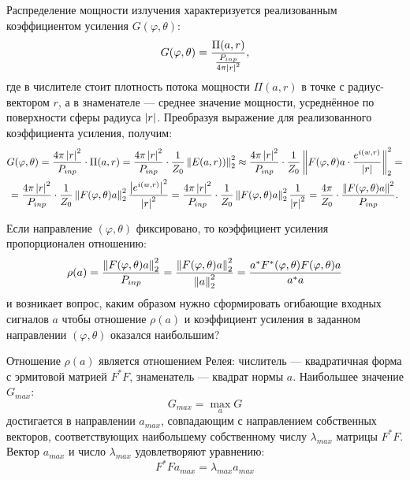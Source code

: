 Распределение мощности излучения характеризуется реализованным коэффициентом усиления $G(\varphi, \theta)$:
\[
    G(\varphi, \theta)
    = \frac{\Pi(a, r)}{\frac{P_{inp}}{4 \pi \left | r \right |^2}},
\]
где в числителе стоит плотность потока мощности $\Pi(a, r)$ в точке с радиус-вектором $r$, а в знаменателе --- среднее значение мощности,
усреднённое по поверхности сферы радиуса $\left | r \right |$. Преобразуя выражение для реализованного коэффициента усиления, получим:
\begin{multline}
    G(\varphi, \theta)
    = \frac{4 \pi \left | r \right |^2}{P_{inp}} \cdot \Pi(a, r)
    = \frac{4 \pi \left | r \right |^2}{P_{inp}} \cdot \frac{1}{Z_0} \left \| E(a, r)) \right \|_2^2
    \approx \frac{4 \pi \left | r \right |^2}{P_{inp}} \cdot \frac{1}{Z_0} \left \| F(\varphi, \theta) a \cdot \frac{e^{i \left ( w, r \right )}}{\left | r \right |} \right \|_2^2 = \\
    = \frac{4 \pi \left | r \right |^2}{P_{inp}} \cdot \frac{1}{Z_0} \left \| F(\varphi, \theta) a \right \|_2^2 \frac{\left | e^{i \left ( w, r \right )} \right |^2}{\left | r \right |^2}
    = \frac{4 \pi \left | r \right |^2}{P_{inp}} \cdot \frac{1}{Z_0} \left \| F(\varphi, \theta) a \right \|_2^2 \frac{1}{\left | r \right |^2}
    = \frac{4 \pi}{Z_0} \cdot \frac{\left \| F(\varphi, \theta) a \right \|^2}{P_{inp}} .
\end{multline}

Если направление $(\varphi, \theta)$ фиксировано, то коэффициент усиления пропорционален отношению:
\begin{equation}
    \label{emission:emitter:gain:rayleigh}
    \rho(a)
    = \frac{\left \| F(\varphi, \theta) a \right \|_2^2}{P_{inp}}
    = \frac{\left \| F(\varphi, \theta) a \right \|_2^2}{\left \| a \right \|_2^2}
    = \frac{a^* F^*(\varphi, \theta) F(\varphi, \theta) a}{a^* a}
\end{equation}
и возникает вопрос, каким образом нужно сформировать огибающие входных сигналов $a$ чтобы отношение $\rho(a)$ и коэффициент усиления в заданном
направлении $(\varphi, \theta)$ оказался наибольшим?

Отношение $\rho(a)$ является отношением Релея: числитель --- квадратичная форма с эрмитовой матрией $F^* F$, знаменатель --- квадрат нормы $a$.
Наибольшее значение $G_{max}$:
\[
    G_{max} = \max \limits_{a} G
\]
достигается в направлении $a_{max}$, совпадающим с направлением собственных векторов, соответствующих наибольшему собственному числу $\lambda_{max}$
матрицы $F^*F$. Вектор $a_{max}$ и число $\lambda_{max}$ удовлетворяют уравнению:
\begin{equation}
    \label{emission:emitter:gain:optimal_input}
    F^* F a_{max} = \lambda_{max} a_{max}
\end{equation}

